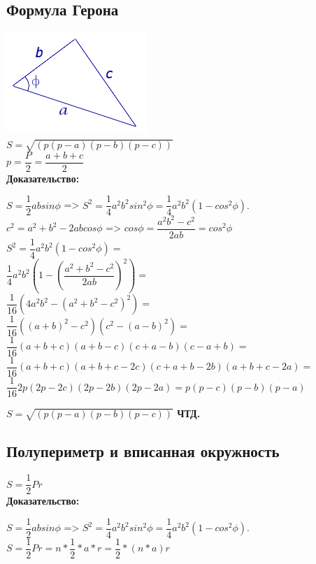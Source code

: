 \documentclass[12pt, letterpaper]{article}
\begin{document}
\subsection {Формула Герона}
\includegraphics[scale=1]{asset.png} \\
$S=\sqrt{(p(p-a)(p-b)(p-c))}$ \\
$p=\dfrac{P}{2}=\dfrac{a+b+c}{2}$ \\
\textbf{Доказательство:} \\
\begin{flushleft}
$S=\dfrac{1}{2}absin\phi$ => $S^2=\dfrac{1}{4}a^2b^2sin^2\phi=\dfrac{1}{4}a^2b^2(1-cos^2\phi).$ \\
$c^2=a^2+b^2-2abcos\phi$ => $cos\phi=\dfrac{a^2b^2-c^2}{2ab}=cos^2\phi$\\
$S^2=\dfrac{1}{4}a^2b^2(1-cos^2\phi)= $ \\
$ \dfrac{1}{4}a^2b^2(1-(\dfrac{a^2+b^2-c^2}{2ab})^2)=$ \\
$ \dfrac{1}{16}(4a^2b^2-(a^2+b^2-c^2)^2)= $ \\
$ \dfrac{1}{16}((a+b)^2-c^2)(c^2-(a-b)^2)= $ \\
$ \dfrac{1}{16}(a+b+c)(a+b-c)(c+a-b)(c-a+b)= $ \\
$ \dfrac{1}{16}(a+b+c)(a+b+c-2c)(c+a+b-2b)(a+b+c-2a)= $ \\ 
$ \dfrac{1}{16}2p(2p-2c)(2p-2b)(2p-2a)= p(p-c)(p-b)(p-a)$ \\
\end{flushleft}
\textbf{$ S=\sqrt{(p(p-a)(p-b)(p-c))} $ ЧТД.}

\subsection {Полупериметр и вписанная окружность}
$S=\dfrac{1}{2}Pr$ \\
\textbf{Доказательство:} \\
\begin{flushleft}
$S=\dfrac{1}{2}absin\phi$ => $S^2=\dfrac{1}{4}a^2b^2sin^2\phi=\dfrac{1}{4}a^2b^2(1-cos^2\phi).$ \\
$S=\dfrac{1}{2}Pr=n*\dfrac{1}{2}*a*r=\dfrac{1}{2}*(n*a)r$ \\
\end{flushleft}
\end{document}
